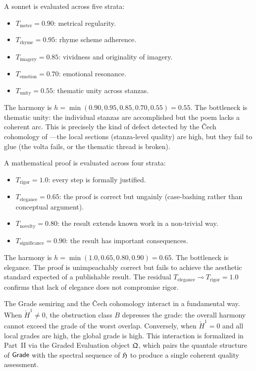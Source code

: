 \begin{example}[Poetry]
\label{ex:grade:poetry}
A sonnet is evaluated across five strata:
\begin{itemize}[nosep]
\item $T_{\text{meter}} = 0.90$: metrical regularity.
\item $T_{\text{rhyme}} = 0.95$: rhyme scheme adherence.
\item $T_{\text{imagery}} = 0.85$: vividness and originality of imagery.
\item $T_{\text{emotion}} = 0.70$: emotional resonance.
\item $T_{\text{unity}} = 0.55$: thematic unity across stanzas.
\end{itemize}
The harmony is $h = \min(0.90, 0.95, 0.85, 0.70, 0.55) = 0.55$.
The bottleneck is thematic unity: the individual stanzas are
accomplished but the poem lacks a coherent arc.  This is precisely
the kind of defect detected by the \v{C}ech cohomology of
---the local sections (stanza-level quality) are
high, but they fail to glue (the volta fails, or the thematic
thread is broken).
\end{example}

\begin{example}[Mathematics]
\label{ex:grade:math}
A mathematical proof is evaluated across four strata:
\begin{itemize}[nosep]
\item $T_{\text{rigor}} = 1.0$: every step is formally justified.
\item $T_{\text{elegance}} = 0.65$: the proof is correct but
  ungainly (case-bashing rather than conceptual argument).
\item $T_{\text{novelty}} = 0.80$: the result extends known work in
  a non-trivial way.
\item $T_{\text{significance}} = 0.90$: the result has important
  consequences.
\end{itemize}
The harmony is $h = \min(1.0, 0.65, 0.80, 0.90) = 0.65$.  The
bottleneck is elegance.  The proof is unimpeachably correct but fails
to achieve the aesthetic standard expected of a publishable result.
The residual $T_{\text{elegance}} \multimap T_{\text{rigor}} = 1.0$
confirms that lack of elegance does not compromise rigor.
\end{example}

\begin{remark}
\label{rem:grade-cohomology-interaction}
The Grade semiring and the \v{C}ech cohomology interact in a
fundamental way.  When $\check{H}^1 \neq 0$, the obstruction class
$B$ depresses the grade: the overall harmony cannot exceed the grade
of the worst overlap.  Conversely, when $\check{H}^1 = 0$ and all
local grades are high, the global grade is high.  This interaction
is formalized in Part~II via the Graded Evaluation object $\mathfrak{Q}$,
which pairs the quantale structure of $\mathsf{Grade}$ with the spectral
sequence of $\mathfrak{H}$ to produce a single coherent quality assessment.
\end{remark}
